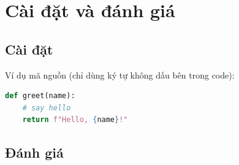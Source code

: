 \section{Cài đặt và đánh giá}
\subsection{Cài đặt}
Ví dụ mã nguồn (chỉ dùng ký tự không dấu bên trong code):
\begin{lstlisting}[language=Python, caption={Ví dụ hàm Python}, label={lst:example}]
def greet(name):
    # say hello
    return f"Hello, {name}!"
\end{lstlisting}

\subsection{Đánh giá}
